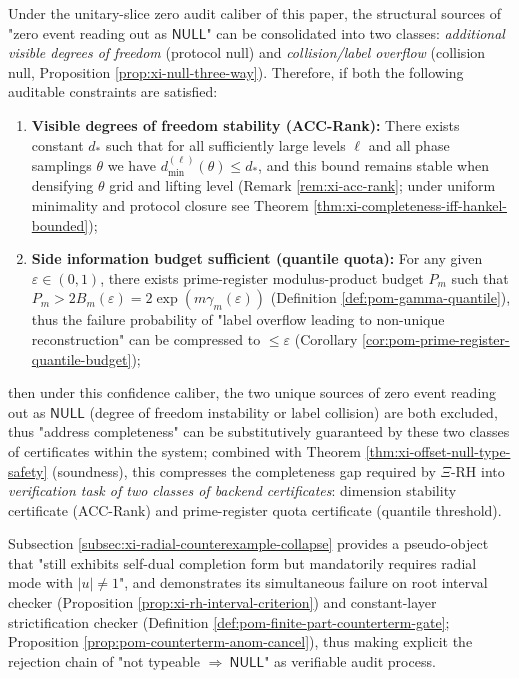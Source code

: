 \begin{proposition}\label{prop:xi-completeness-auditable-decomposition}
Under the unitary-slice zero audit caliber of this paper, the structural sources of "zero event reading out as \(\mathsf{NULL}\)" can be consolidated into two classes: \emph{additional visible degrees of freedom} (protocol null) and \emph{collision/label overflow} (collision null, Proposition \ref{prop:xi-null-three-way}).
Therefore, if both the following auditable constraints are satisfied:
\begin{enumerate}
  \item \textbf{Visible degrees of freedom stability (ACC-Rank):} There exists constant \(d_\ast\) such that for all sufficiently large levels \(\ell\) and all phase samplings \(\theta\) we have \(d^{(\ell)}_{\min}(\theta)\le d_\ast\), and this bound remains stable when densifying \(\theta\) grid and lifting level (Remark \ref{rem:xi-acc-rank}; under uniform minimality and protocol closure see Theorem \ref{thm:xi-completeness-iff-hankel-bounded});
  \item \textbf{Side information budget sufficient (quantile quota):} For any given \(\varepsilon\in(0,1)\), there exists prime-register modulus-product budget \(P_m\) such that
  \(
  P_m>2B_m(\varepsilon)=2\exp(m\gamma_m(\varepsilon))
  \)
  (Definition \ref{def:pom-gamma-quantile}), thus the failure probability of "label overflow leading to non-unique reconstruction" can be compressed to \(\le\varepsilon\) (Corollary \ref{cor:pom-prime-register-quantile-budget});
\end{enumerate}
then under this confidence caliber, the two unique sources of zero event reading out as \(\mathsf{NULL}\) (degree of freedom instability or label collision) are both excluded, thus "address completeness" can be substitutively guaranteed by these two classes of certificates within the system; combined with Theorem \ref{thm:xi-offset-null-type-safety} (soundness), this compresses the completeness gap required by \(\Xi\)-RH into \emph{verification task of two classes of backend certificates}: dimension stability certificate (ACC-Rank) and prime-register quota certificate (quantile threshold).
\end{proposition}

\begin{remark}\label{rem:xi-radial-collapse-template}
Subsection \ref{subsec:xi-radial-counterexample-collapse} provides a pseudo-object that "still exhibits self-dual completion form but mandatorily requires radial mode with \(|u|\neq 1\)", and demonstrates its simultaneous failure on root interval checker (Proposition \ref{prop:xi-rh-interval-criterion}) and constant-layer strictification checker (Definition \ref{def:pom-finite-part-counterterm-gate}; Proposition \ref{prop:pom-counterterm-anom-cancel}), thus making explicit the rejection chain of "not typeable \(\Rightarrow\ \mathsf{NULL}\)" as verifiable audit process.
\end{remark}

